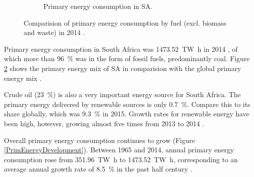 \begin{figure}[!b]
\begin{subfigure}[b]{0.45\textwidth}
                \caption{Primary energy consumption in SA.}\label{PrimSA}
        \end{subfigure}
\caption[Comparision of primary energy consumption by fuel in 2014.]{Comparision of primary energy consumption by fuel (excl. biomass and waste) in 2014 \cite{BP2015b}.}\label{PEKreis}
\end{figure}
Primary energy consumption in South Africa was \SI{1473.52}{\tera\watt\hour} in 2014 \cite{BP2015b}, of which more than \SI{96}{\percent} was in the form of fossil fuels, predominantly coal. Figure \ref{PEKreis} shows the primary energy mix of SA in comparision with the global primary energy mix \cite{BP2015b}.

Crude oil (\SI{23}{\percent}) is also a very important energy source for South Africa. The primary energy delivered by renewable sources is only \SI{0.7}{\percent}. Compare this to its share globally, which was \SI{9.3}{\percent} in 2015. Growth rates for renewable energy have been high, however, growing almost five times from 2013 to 2014 \cite{BP2015b}.

Overall primary energy consumption continues to grow (Figure \ref{PrimEnergyDevelopment}). Between 1965 and 2014, annual primary energy consumption rose from \SI{351.96}{\tera\watt\hour} to \SI{1473.52}{\tera\watt\hour}, corresponding to an average annual growth rate of \SI{8.5}{\percent} in the past half century \cite{BP2015c}.

